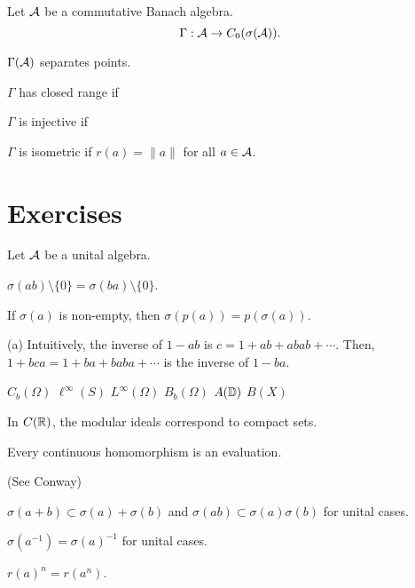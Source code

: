\documentclass{../../large}
\begin{document}
\begin{prb}
Let $\mathcal{A}$ be a commutative Banach algebra.
\[\Gamma:\mathcal{A}\to C_0(\sigma(\mathcal{A})).\]
\begin{parts}
\item $\Gamma(\mathcal{A})$ separates points.
\item $\Gamma$ has closed range if
\item $\Gamma$ is injective if
\item $\Gamma$ is isometric if $r(a)=\|a\|$ for all $a\in\mathcal{A}$.
\end{parts}
\end{prb}





\section*{Exercises}
\begin{prb}
Let $\mathcal{A}$ be a unital algebra.
\begin{parts}
\item $\sigma(ab)\setminus\{0\}=\sigma(ba)\setminus\{0\}$.
\item If $\sigma(a)$ is non-empty, then $\sigma(p(a))=p(\sigma(a))$.
\end{parts}
\end{prb}
\begin{pf}
(a)
Intuitively, the inverse of $1-ab$ is $c=1+ab+abab+\cdots$.
Then, $1+bca=1+ba+baba+\cdots$ is the inverse of $1-ba$.
\end{pf}

$C_b(\Omega)$ $\ell^\infty(S)$ $L^\infty(\Omega)$ $B_b(\Omega)$ $A(\mathbb{D})$
$B(X)$

\begin{prb}
In $C(\mathbb{R})$, the modular ideals correspond to compact sets.
\end{prb}

\begin{prb}
\begin{parts}
\item Every continuous homomorphism is an evaluation.
\end{parts}
\end{prb}

\begin{prb}
(See Conway)
\end{prb}

\begin{prb}
\begin{parts}
\item $\sigma(a+b)\subset\sigma(a)+\sigma(b)$ and $\sigma(ab)\subset\sigma(a)\sigma(b)$ for unital cases.
\item $\sigma(a^{-1})=\sigma(a)^{-1}$ for unital cases.
\item $r(a)^n=r(a^n)$.
\end{parts}
\end{prb}
\end{document}
